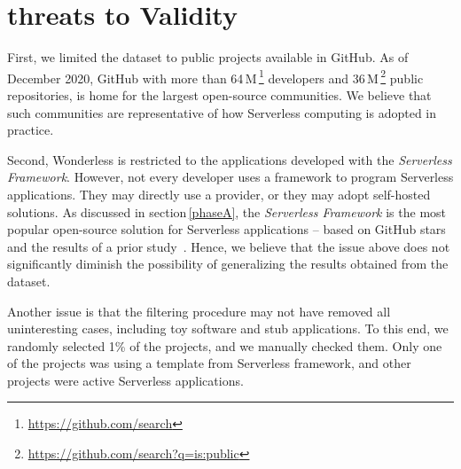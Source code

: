 \section{threats to Validity}
\label{limitations}

%

First, we limited the dataset to public projects available in GitHub. As of December 2020, 
GitHub with more than 64\,M\,\footnote{\url{https://github.com/search}} 
developers and 36\,M\,\footnote{\url{https://github.com/search?q=is:public}} public 
repositories, is home for the largest open-source communities. 
We believe that such communities are 
representative of 
how Serverless computing is adopted in practice.
%

Second, Wonderless is restricted to the applications 
developed with the \emph{Serverless Framework}. 
However, not every developer uses a framework to program Serverless applications. 
They may directly use a provider, or they may adopt self-hosted solutions. 
%
As discussed in section\,\ref{phaseA}, the \emph{Serverless Framework} is the 
most popular open-source solution for Serverless applications -- 
based on GitHub stars and the results of a prior study~\cite{kritikos2018review}. 
Hence, we believe that the issue above does not significantly diminish 
the possibility of generalizing the results obtained from the dataset.

Another issue is that the filtering procedure may not have removed all 
uninteresting cases, including toy software and stub applications.
To this end, we randomly selected 1\% of the projects, 
and we manually checked them. 
Only one of the projects was using a template from Serverless framework, 
and other projects were active Serverless applications.








